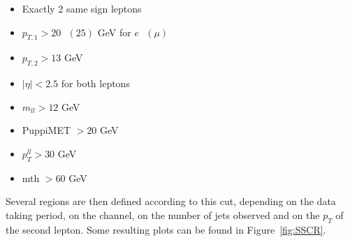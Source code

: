 \documentclass[a4paper, 10pt, openright]{report}
\begin{document}
\begin{multicols}{2}
\begin{itemize}
\item Exactly 2 same sign leptons
\item $p_{T, 1} > 20 \text{ } (25)$ GeV for $e \text{ }(\mu)$
\item $p_{T, 2} > 13$ GeV  
\item $|\eta| < 2.5$ for both leptons
\item $m_{ll} > 12$ GeV
\item PuppiMET $> 20$ GeV
\item $p_T^{ll} > 30$ GeV
\item mth $> 60$ GeV
\end{itemize}
\end{multicols}

Several regions are then defined according to this cut, depending on the data taking period, on the channel, on the number of jets observed and on the $p_T$ of the second lepton. Some resulting plots can be found in Figure~\ref{fig:SSCR}.
\end{document}
